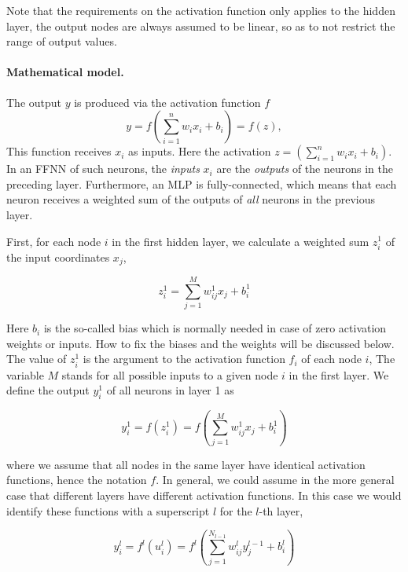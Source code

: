 \documentclass[%
oneside,                 %
final,                   %
10pt]{article}
\begin{document}
Note that the requirements on the activation function only applies to
the hidden layer, the output nodes are always assumed to be linear, so
as to not restrict the range of output values.


\paragraph{Mathematical model.}
The output $y$ is produced via the activation function $f$
\[
 y = f\left(\sum_{i=1}^n w_ix_i + b_i\right) = f(z),
\]
This function receives $x_i$ as inputs.
Here the activation $z=(\sum_{i=1}^n w_ix_i+b_i)$. 
In an FFNN of such neurons, the \emph{inputs} $x_i$ are the \emph{outputs} of
the neurons in the preceding layer. Furthermore, an MLP is
fully-connected, which means that each neuron receives a weighted sum
of the outputs of \emph{all} neurons in the previous layer.


First, for each node $i$ in the first hidden layer, we calculate a weighted sum $z_i^1$ of the input coordinates $x_j$,

\begin{equation} z_i^1 = \sum_{j=1}^{M} w_{ij}^1 x_j + b_i^1
\end{equation}

Here $b_i$ is the so-called bias which is normally needed in
case of zero activation weights or inputs. How to fix the biases and
the weights will be discussed below.  The value of $z_i^1$ is the
argument to the activation function $f_i$ of each node $i$, The
variable $M$ stands for all possible inputs to a given node $i$ in the
first layer.  We define  the output $y_i^1$ of all neurons in layer 1 as

\begin{equation}
 y_i^1 = f(z_i^1) = f\left(\sum_{j=1}^M w_{ij}^1 x_j  + b_i^1\right)
 \label{outputLayer1}
\end{equation}

where we assume that all nodes in the same layer have identical
activation functions, hence the notation $f$. In general, we could assume in the more general case that different layers have different activation functions.
In this case we would identify these functions with a superscript $l$ for the $l$-th layer,

\begin{equation}
 y_i^l = f^l(u_i^l) = f^l\left(\sum_{j=1}^{N_{l-1}} w_{ij}^l y_j^{l-1} + b_i^l\right)
 \label{generalLayer}
\end{equation}
\end{document}
